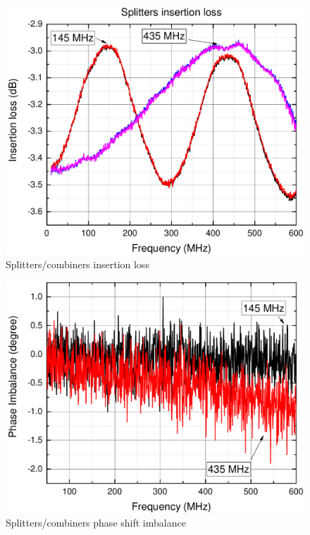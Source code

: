 \begin{figure}
    \centering
    \includegraphics[width=0.6\paperwidth]{img/7/splitter_amplitude.pdf}
    \caption{Splitters/combiners insertion loss}
    \label{splitter_amplitude}
\end{figure}

\begin{figure}
    \centering
    \includegraphics[width=0.6\paperwidth]{img/7/splitter_phase.pdf}
    \caption{Splitters/combiners phase shift imbalance}
    \label{splitter_phase}
\end{figure}

